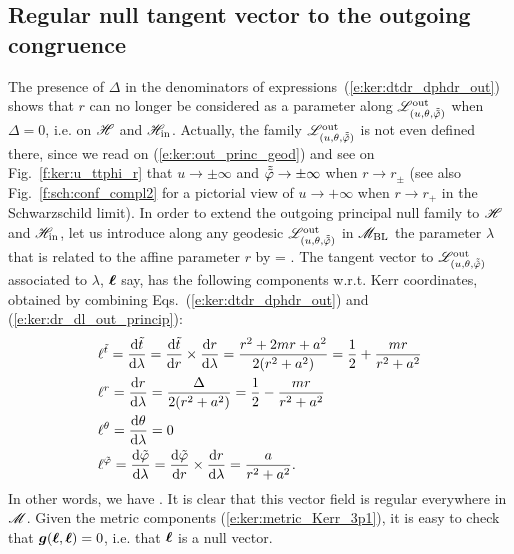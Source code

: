 \subsection{Regular null tangent vector to the outgoing congruence}

The presence of $\Delta$ in the denominators of expressions~(\ref{e:ker:dtdr_dphdr_out})
shows that $r$ can no longer be considered as
a parameter along $\mathscr{L}^{\rm out}_{(u,\theta,\tilde{{\tilde\varphi}})}$ when
$\Delta=0$, i.e. on $\mathscr{H}$ and $\mathscr{H}_{\rm in}$. Actually, the family $\mathscr{L}^{\rm out}_{(u,\theta,\tilde{{\tilde\varphi}})}$ is not even defined there, since we read on
(\ref{e:ker:out_princ_geod}) and see on Fig.~\ref{f:ker:u_ttphi_r} that
$u\to\pm\infty$ and $\tilde{{\tilde\varphi}}\to \pm\infty$ when $r\to r_\pm$ (see also
Fig.~\ref{f:sch:conf_compl2} for a pictorial view of $u\to+\infty$ when $r\to r_+$ in the Schwarzschild limit).
In order to extend the outgoing principal null family to $\mathscr{H}$ and $\mathscr{H}_{\rm in}$,
let us introduce
along any geodesic $\mathscr{L}^{\rm out}_{(u,\theta,\tilde{{\tilde\varphi}})}$ in $\mathscr{M}_{\rm BL}$ the parameter $\lambda$
that is related to the affine parameter $r$ by
\be \label{e:ker:dr_dl_out_princip}
     =  .
\ee
The tangent vector to $\mathscr{L}^{\rm out}_{(u,\theta,\tilde{{\tilde\varphi}})}$ associated
to $\lambda$, $\bm{\ell}$ say, has the following components w.r.t. Kerr coordinates, obtained
by combining Eqs.~(\ref{e:ker:dtdr_dphdr_out}) and (\ref{e:ker:dr_dl_out_princip}):
\begin{align}
& \ell^{{\tilde t}} = \frac{\mathrm{d} {\tilde t}}{\mathrm{d}\lambda} = \frac{\mathrm{d} {\tilde t}}{\mathrm{d} r}\times\frac{\mathrm{d} r}{\mathrm{d}\lambda}
    = \frac{r^2 + 2m r + a^2}{2(r^2+a^2)} = \frac{1}{2} + \frac{m r}{r^2 + a^2} \nonumber \\
& \ell^{r} = \frac{\mathrm{d} r}{\mathrm{d}\lambda} = \frac{\Delta}{2(r^2+a^2)} = \frac{1}{2} - \frac{m r}{r^2 + a^2}\nonumber \\
& \ell^{\theta} = \frac{\mathrm{d} \theta}{\mathrm{d}\lambda} = 0 \nonumber\\
& \ell^{{\tilde\varphi}} = \frac{\mathrm{d} {\tilde\varphi}}{\mathrm{d}\lambda} = \frac{\mathrm{d} {\tilde\varphi}}{\mathrm{d} r}\times\frac{\mathrm{d} r}{\mathrm{d}\lambda}
    = \frac{a}{r^2+a^2} . \nonumber
\end{align}
In other words, we have
\be \label{e:ker:def_ell_outgoing}
     .
\ee
It is clear that this vector field is regular everywhere in $\mathscr{M}$.
Given the metric components (\ref{e:ker:metric_Kerr_3p1}), it is easy
to check that $\bm{g}(\bm{\ell},\bm{\ell})=0$, i.e. that $\bm{\ell}$ is a null vector.
